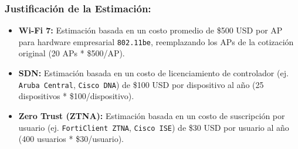 \subsubsection*{Justificación de la Estimación:}
\begin{itemize}
\item \textbf{Wi-Fi 7:} Estimación basada en un costo promedio de \$500 USD por AP para hardware empresarial \texttt{802.11be}, reemplazando los APs de la cotización original (20 APs * \$500/AP).
\item \textbf{SDN:} Estimación basada en un costo de licenciamiento de controlador (ej. \texttt{Aruba Central}, \texttt{Cisco DNA}) de \$100 USD por dispositivo al año (25 dispositivos * \$100/dispositivo).
\item \textbf{Zero Trust (ZTNA):} Estimación basada en un costo de suscripción por usuario (ej. \texttt{FortiClient ZTNA}, \texttt{Cisco ISE}) de \$30 USD por usuario al año (400 usuarios * \$30/usuario).
\end{itemize}